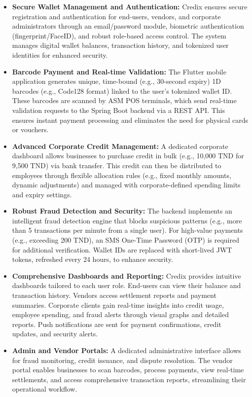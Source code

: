 \begin{itemize}
    \item \textbf{Secure Wallet Management and Authentication:}
    Credix ensures secure registration and authentication for end-users, vendors, and corporate administrators through an email/password module, biometric authentication (fingerprint/FaceID), and robust role-based access control. The system manages digital wallet balances, transaction history, and tokenized user identities for enhanced security.

    \item \textbf{Barcode Payment and Real-time Validation:}
    The Flutter mobile application generates unique, time-bound (e.g., 30-second expiry) 1D barcodes (e.g., Code128 format) linked to the user's tokenized wallet ID. These barcodes are scanned by ASM POS terminals, which send real-time validation requests to the Spring Boot backend via a REST API. This ensures instant payment processing and eliminates the need for physical cards or vouchers.

    \item \textbf{Advanced Corporate Credit Management:}
    A dedicated corporate dashboard allows businesses to purchase credit in bulk (e.g., 10,000 TND for 9,500 TND) via bank transfer. This credit can then be distributed to employees through flexible allocation rules (e.g., fixed monthly amounts, dynamic adjustments) and managed with corporate-defined spending limits and expiry settings.

    \item \textbf{Robust Fraud Detection and Security:}
    The backend implements an intelligent fraud detection engine that blocks suspicious patterns (e.g., more than 5 transactions per minute from a single user). For high-value payments (e.g., exceeding 200 TND), an SMS One-Time Password (OTP) is required for additional verification. Wallet IDs are replaced with short-lived JWT tokens, refreshed every 24 hours, to enhance security.

    \item \textbf{Comprehensive Dashboards and Reporting:}
    Credix provides intuitive dashboards tailored to each user role. End-users can view their balance and transaction history. Vendors access settlement reports and payment summaries. Corporate clients gain real-time insights into credit usage, employee spending, and fraud alerts through visual graphs and detailed reports. Push notifications are sent for payment confirmations, credit updates, and security alerts.

    \item \textbf{Admin and Vendor Portals:}
    A dedicated administrative interface allows for fraud monitoring, credit issuance, and dispute resolution. The vendor portal enables businesses to scan barcodes, process payments, view real-time settlements, and access comprehensive transaction reports, streamlining their operational workflow.
\end{itemize}

